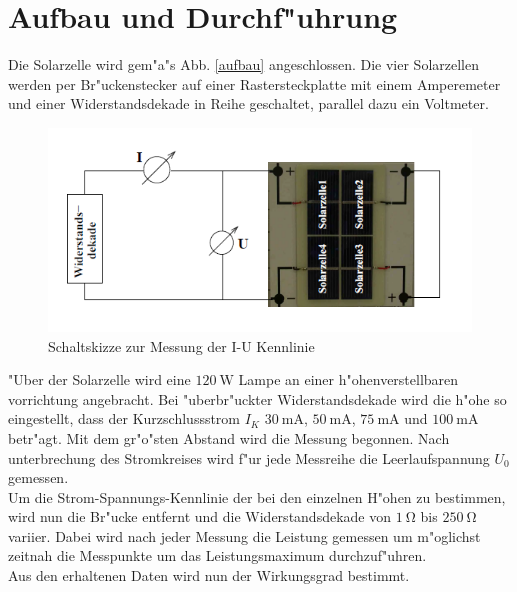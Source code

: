 \section{Aufbau und Durchf"uhrung}
	\label{sec:durchfuehrung}

	Die Solarzelle wird gem"a"s Abb. \eqref{aufbau} angeschlossen.
	Die vier Solarzellen werden per Br"uckenstecker auf einer Rastersteckplatte mit einem  Amperemeter und einer Widerstandsdekade in Reihe geschaltet, parallel dazu ein Voltmeter.

	\begin{figure}[htbp]
		\centering
		\includegraphics[width = 12cm]{img/aufbau.PNG}
		\caption{Schaltskizze zur Messung der I-U Kennlinie}
		\label{aufbau}
	\end{figure}

	"Uber der Solarzelle wird eine $\SI{120}{\watt}$ Lampe an einer h"ohenverstellbaren vorrichtung angebracht.
	Bei "uberbr"uckter Widerstandsdekade wird die h"ohe so eingestellt, dass der Kurzschlussstrom $I_K$ $\SI{30}{\milli\ampere}$, $\SI{50}{\milli\ampere}$, $\SI{75}{\milli\ampere}$ und $\SI{100}{\milli\ampere}$ betr"agt.
	Mit dem gr"o"sten Abstand wird die Messung begonnen.
	Nach unterbrechung des Stromkreises wird f"ur jede Messreihe die Leerlaufspannung $U_0$ gemessen.\\
	Um die Strom-Spannungs-Kennlinie der bei den einzelnen H"ohen zu bestimmen, wird nun die Br"ucke entfernt und die Widerstandsdekade von $\SI{1}{\ohm}$ bis $\SI{250}{\ohm}$ variier.
	Dabei wird nach jeder Messung die Leistung gemessen um m"oglichst zeitnah die Messpunkte um das Leistungsmaximum durchzuf"uhren.\\
	Aus den erhaltenen Daten wird nun der Wirkungsgrad bestimmt.